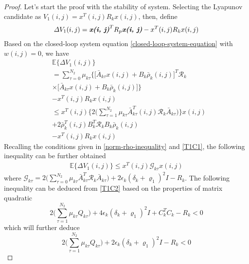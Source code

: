 \documentclass[conference]{IEEEtran}
\begin{document}
\begin{proof}
	Let's start the proof with the stability of system. Selecting the Lyapunov candidate as $V_{1}(i,j) = x^{T}(i,j)R_{k}x(i,j)$, then, define
	\begin{equation}\label{VAR-DELTA-V1}
	\varDelta V_{1}(i,j) = \emph{\textbf{x(i, j)}}^{T}R_{p}\emph{\textbf{x(i, j)}} - x^{T}(i,j)R_{k}x(i,j)
	\end{equation}
	Based on the closed-loop system equation \eqref{closed-loop-system-equation} with $w(i,j)=0$, we have 
	\begin{equation}
	\begin{split}
	&\mathbb{E}\{\varDelta V_{1}(i,j) \}\\
	&=  \sum_{\tau =0}^{N_{2}}\mu_{k\tau }\Big\{\big[\bar{A}_{k\tau }x(i,j)+B_{k}\bar{\rho}_{k}(i,j)\big]^{T}\mathcal{R}_{k}\\
	&\times\big[\bar{A}_{k\tau }x(i,j)+B_{k}\bar{\rho}_{k}(i,j)\big]\Big\}\\
	&- x^{T}(i,j)R_{k}x(i,j) \\
	&\leq x^{T}(i,j) \Big\{2\big(\sum_{\tau =1}^{N_{2}}\mu_{k\tau }\bar{A}^{T}_{k\tau }(i,j)\mathcal{R}_{k}\bar{A}_{k\tau }\big)\Big\}x(i,j)\\ &+2\bar{\rho}^{T}_{k}(i,j)B^{T}_{k}\mathcal{R}_{k}B_{k}\bar{\rho}_{k}(i,j) \\
	&-  x^{T}(i,j)R_{k}x(i,j)
	\end{split}
	\end{equation}
	Recalling the conditions given in \eqref{norm-rho-inequality} and \eqref{T1C1}, the following inequality can be further obtained
	\begin{equation}\label{combine-one-1}
	\begin{split}
		\mathbb{E}\{\varDelta  V_{1}(i,j) \} \leq x^{T}(i,j)\mathcal{G}_{k\tau }x(i,j)
	\end{split}
	\end{equation}
	where $\mathcal{G}_{k\tau }= 2\big(\sum_{\tau =0}^{N_{2}}\mu_{k\tau }\bar{A}^{T}_{k\tau }\mathcal{R}_{k}\bar{A}_{k\tau }\big)
	+ 2\epsilon_{k}(\delta_{k}+\varrho_{1})^{2}I- R_{k}$.
	The following inequality can be deduced from \eqref{T1C2} based on the properties of  matrix quadratic
	\begin{equation}
	2\big(\sum_{\tau =1}^{N_{2}}\mu_{k\tau }Q_{k\tau }\big)+4\epsilon_{k}(\delta_{k}+\varrho_{1})^{2}I+C^{T}_{k}C_{k}-R_{k} < 0
	\end{equation}
	which will further deduce
	\begin{equation}\label{combine-one-2}
			2\big(\sum_{\tau =1}^{N_{2}}\mu_{k\tau }Q_{k\tau }\big)+2\epsilon_{k}(\delta_{k}+\varrho_{1})^{2}I-R_{k} < 0

\end{equation}
\end{proof}
\end{document}
